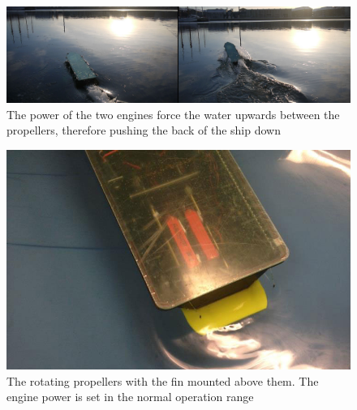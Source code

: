 \begin{figure}[htbp]
	\centering
	\includegraphics[width=\textwidth]{Pictures/forward.jpg}
	\caption{The power of the two engines force the water upwards between the propellers, therefore pushing the back of the ship down}
	\label{fig:waterpushup}
\end{figure}

\begin{figure}[fin]
	\centering
	\includegraphics[width=\textwidth]{Pictures/fin.jpg}
	\caption{The rotating propellers with the fin mounted above them. The engine power is set in the normal operation range}
	\label{fig:fin}
\end{figure}